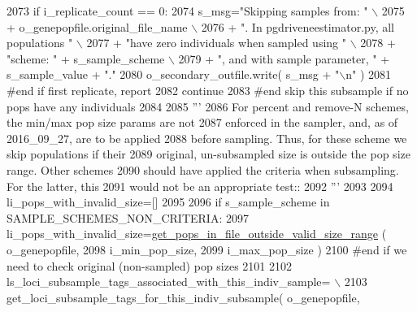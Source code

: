 \begin{DoxyCode}
2073             \textcolor{keywordflow}{if} i\_replicate\_count == 0:
2074                 s\_msg=\textcolor{stringliteral}{"Skipping samples from: "} \(\backslash\)
2075                         + o\_genepopfile.original\_file\_name \(\backslash\)
2076                         + \textcolor{stringliteral}{".  In pgdriveneestimator.py, all populations "} \(\backslash\)
2077                         + \textcolor{stringliteral}{"have zero individuals when sampled using "} \(\backslash\)
2078                         + \textcolor{stringliteral}{"scheme: "} + s\_sample\_scheme \(\backslash\)
2079                         + \textcolor{stringliteral}{", and with sample parameter, "} + s\_sample\_value + \textcolor{stringliteral}{"."}
2080                 o\_secondary\_outfile.write( s\_msg + \textcolor{stringliteral}{"\(\backslash\)n"} )
2081             \textcolor{comment}{#end if first replicate, report}
2082             \textcolor{keywordflow}{continue}
2083         \textcolor{comment}{#end skip this subsample if no pops have any individuals}
2084 
2085         \textcolor{stringliteral}{'''}
2086 \textcolor{stringliteral}{        For percent and remove-N schemes, the min/max pop size params are not }
2087 \textcolor{stringliteral}{        enforced in the sampler, and, as of 2016\_09\_27, are to be applied}
2088 \textcolor{stringliteral}{        before sampling.  Thus, for these scheme we skip populations if their }
2089 \textcolor{stringliteral}{        original, un-subsampled size is outside the pop size range.  Other schemes}
2090 \textcolor{stringliteral}{        should have applied the criteria when subsampling.  For the latter, this}
2091 \textcolor{stringliteral}{        would not be an appropriate test::}
2092 \textcolor{stringliteral}{        '''}
2093 
2094         li\_pops\_with\_invalid\_size=[]
2095         
2096         \textcolor{keywordflow}{if} s\_sample\_scheme \textcolor{keywordflow}{in} SAMPLE\_SCHEMES\_NON\_CRITERIA:
2097             li\_pops\_with\_invalid\_size=\hyperlink{namespacenegui_1_1pgdriveneestimator_a06645f9b380f736368e27585331ec22f}{get\_pops\_in\_file\_outside\_valid\_size\_range}
      ( o\_genepopfile, 
2098                                                                                 i\_min\_pop\_size,
2099                                                                                 i\_max\_pop\_size )
2100         \textcolor{comment}{#end if we need to check original (non-sampled) pop sizes}
2101 
2102         ls\_loci\_subsample\_tags\_associated\_with\_this\_indiv\_sample= \(\backslash\)
2103                 get\_loci\_subsample\_tags\_for\_this\_indiv\_subsample( o\_genepopfile,

\end{DoxyCode}

